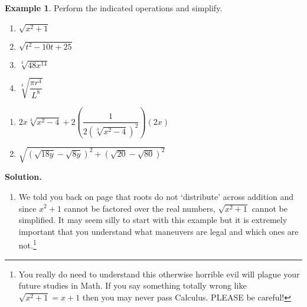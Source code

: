 \documentclass[11pt]{article}
\theoremstyle{definition}  %
\newtheorem{ex}{\bf Example}
\newcounter{HW}
\begin{document}
\begin{ex}\label{simplifyradexpressions}  Perform the indicated operations and simplify.

\begin{multicols}{4}

\begin{enumerate}

\item  $\sqrt{x^{2} + 1}$

\item  $\sqrt{t^2-10t+25}$

\item  $\sqrt[3]{48x^{14}}$

\item  $\sqrt[4]{\dfrac{\pi r^{4}}{L^{8}}}$


\setcounter{HW}{\value{enumi}}

\end{enumerate}

\end{multicols}

\begin{multicols}{2}

\begin{enumerate}
\setcounter{enumi}{\value{HW}}

\item $2x \sqrt[3]{x^2-4} + 2\left(\dfrac{1}{2(\sqrt[3]{x^2-4})^2}\right)  (2x)$ 

\item  $\sqrt{(\sqrt{18y} - \sqrt{8y})^2 + (\sqrt{20} - \sqrt{80})^2}$ 

\end{enumerate}

\end{multicols}

{\bf Solution.}

\begin{enumerate}

\item We told you back on page \pageref{donotdistributeexponents} that roots do not `distribute' across addition and since $x^{2} + 1$ cannot be factored over the real numbers, $\sqrt{x^{2} + 1}$ cannot be simplified.  It may seem silly to start with this example but it is extremely important that you understand what maneuvers are legal and which ones are not.\footnote{You really do need to understand this otherwise horrible evil will plague your future studies in Math.  If you say something totally wrong like $\sqrt{x^{2} + 1} = x + 1$ then you may never pass Calculus.  PLEASE be careful!}


\end{enumerate}
\end{ex}
\end{document}
